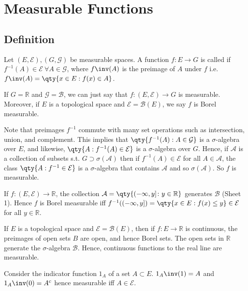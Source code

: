 \section{Measurable Functions}
\subsection{Definition}
\begin{definition}[Measurable]
	Let $(E, \mathcal E), (G, \mathcal G)$ be measurable spaces.
	A function $f \colon E \to G$ is called  if $f^{-1}(A) \in \mathcal E \ \forall A \in \mathcal{G}$, where $f\inv(A)$ is the preimage of $A$ under $f$ i.e. $f\inv(A) = \qty{x \in E : f(x) \in A}$.
\end{definition}

If $G = \mathbb R$ and $\mathcal G = \mathcal B$, we can just say that $f \colon (E, \mathcal E) \to G$ is measurable.
Moreover, if $E$ is a topological space and $\mathcal E = \mathcal B(E)$, we say $f$ is Borel measurable.

Note that preimages $f^{-1}$ commute with many set operations such as intersection, union, and complement.
This implies that $\qty{f^{-1}(A) : A \in \mathcal G}$ is a $\sigma$-algebra over $E$, and likewise, $\qty{A : f^{-1}(A) \in \mathcal E}$ is a $\sigma$-algebra over $G$.
Hence, if $\mathcal A$ is a collection of subsets s.t. $G \supset \sigma(\mathcal{A})$ then if $f^{-1}(A) \in \mathcal E$ for all $A \in \mathcal A$, the class $\qty{A : f^{-1} \in \mathcal E}$ is a $\sigma$-algebra that contains $\mathcal A$ and so $\sigma(\mathcal{A})$.
So $f$ is measurable.

If $f \colon (E, \mathcal E) \to \mathbb R$, the collection $\mathcal A = \qty{(-\infty,y] \colon y \in \mathbb R}$ generates $\mathcal B$ (Sheet 1).
Hence $f$ is Borel measurable iff $f^{-1}((-\infty,y]) = \qty{x \in E : f(x) \leq y} \in \mathcal E$ for all $y \in \mathbb R$.

If $E$ is a topological space and $\mathcal E = \mathcal B(E)$, then if $f \colon E \to \mathbb R$ is continuous, the preimages of open sets $B$ are open, and hence Borel sets.
The open sets in $\mathbb R$ generate the $\sigma$-algebra $\mathcal B$.
Hence, continuous functions to the real line are measurable.

\begin{example}
	Consider the indicator function $1_A$ of a set $A \subset E$. $1_A\inv(1) = A$ and $1_A\inv(0) = A^c$ hence measurable iff $A \in \mathcal E$.
\end{example}


